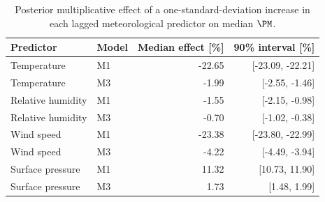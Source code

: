 \begin{table}[H]
\caption{Posterior multiplicative effect of a one-standard-deviation increase in each lagged meteorological predictor on median $\PM$.\label{tab:meteorological-effects}}
\centering
\small
\begin{tabular}{llrr}
\toprule
\textbf{Predictor} & \textbf{Model} & \textbf{Median effect [\%]} & \textbf{90\% interval [\%]}\\
\midrule
Temperature & M1 & -22.65 & [-23.09, -22.21]\\
Temperature & M3 & {-1.99} & {[-2.55, -1.46]}\\
Relative humidity & M1 & -1.55 & [-2.15, -0.98]\\
Relative humidity & M3 & {-0.70} & {[-1.02, -0.38]}\\
Wind speed & M1 & -23.38 & [-23.80, -22.99]\\
Wind speed & M3 & {-4.22} & {[-4.49, -3.94]}\\
Surface pressure & M1 & 11.32 & [10.73, 11.90]\\
Surface pressure & M3 & {1.73} & {[1.48, 1.99]}\\
\bottomrule
\end{tabular}
\end{table}
